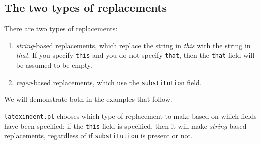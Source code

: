 \subsection{The two types of replacements}
	There are two types of replacements:
	\begin{enumerate}
		\item \emph{string}-based replacements, which replace the string in
		      \emph{this} with the string in \emph{that}.
		      If you specify \texttt{this} and you do not specify \texttt{that}, then
		      the \texttt{that} field will be assumed to be empty.
		\item \emph{regex}-based replacements, which use the \texttt{substitution} field.
	\end{enumerate}
	We will demonstrate both in the examples that follow.

	\texttt{latexindent.pl} chooses which type of replacement to make based on which fields
	have been specified; if the \texttt{this} field is specified, then it will make
	\emph{string}-based replacements, regardless of if \texttt{substitution} is
	present or not.

